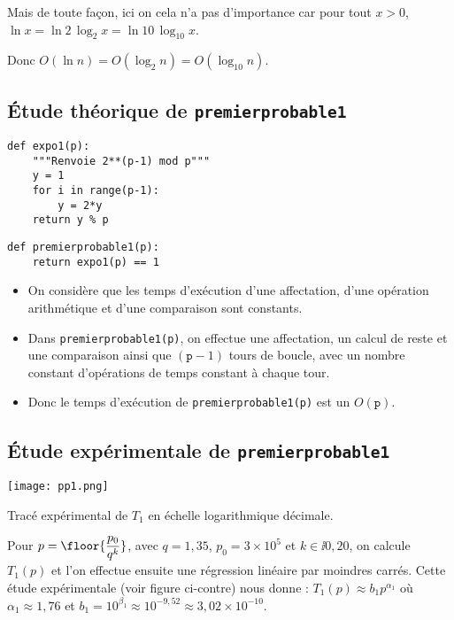 Mais de toute façon, ici on cela n'a pas d'importance car pour tout $x>0$, $ \ln x = \ln 2 \, \log_{2} x = \ln 10\, \log_{10}x$.

Donc $ O(\ln n) = O(\log_{2} n) = O(\log_{10} n)$.

\subsection{Étude théorique de \texttt{premierprobable1}}


\begin{lstlisting}
def expo1(p):
    """Renvoie 2**(p-1) mod p"""
    y = 1
    for i in range(p-1):
        y = 2*y
    return y % p
\end{lstlisting}

\begin{lstlisting}
def premierprobable1(p):
    return expo1(p) == 1
\end{lstlisting}

\begin{itemize}
\item On considère que les temps d'exécution d'une affectation, d'une
  opération arithmétique et d'une comparaison sont constants.
\item Dans \texttt{premierprobable1(p)}, on effectue une affectation, un
  calcul de reste et
  une comparaison ainsi que $(\texttt{p}-1)$ tours de boucle, avec un
  nombre constant d'opérations de temps constant à chaque tour.
\item Donc le temps d'exécution de \texttt{premierprobable1(p)} est un
  $O(\texttt{p})$.
\end{itemize}

\subsection{Étude expérimentale de \texttt{premierprobable1}}

  \begin{marginfigure}
    \texttt{[image: pp1.png]}
    \caption{Tracé expérimental de $T_1$ en échelle logarithmique décimale.}
  \end{marginfigure}


Pour $p = \floor{\dfrac{p_0}{q^k}}$, avec $q = 1,35$, $p_0 = 3\times 10^5$ et $k\in\ii{0,20}$, on calcule $T_1(p)$ et l'on effectue ensuite une régression linéaire par moindres carrés. Cette étude expérimentale 
(voir figure ci-contre)
nous donne :
$  T_{1}(p)\approx b_{1} p^{\alpha_{1}}$ où $\alpha_{1}\approx 1,76$
et  $b_{1} = 10^{\beta_{1}} \approx 10^{-9,52}  \approx 3,02 \times 10^{-10}$.


